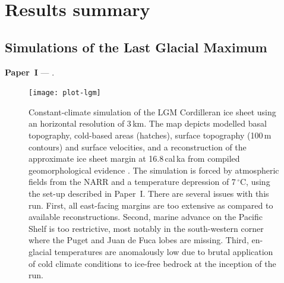 \documentclass[a4paper]{kappa}
\newcommand{\unit}[1]{\ensuremath{\mathrm{#1}}}
\newcommand{\degree}[0]{\ensuremath{^{\circ}}}
\newcommand{\degC}[0]{\unit{{\degree}C}}
\newcommand{\CCLI}[0]{Paper~I}      %
\begin{document}
\newpage
\section{Results summary}

\subsection{Simulations of the Last Glacial Maximum}

\noindent\textbf{\CCLI} --- .
\bigskip

\begin{figure}
  \begin{minipage}[t]{112.5mm}\vspace{0pt}
    \texttt{[image: plot-lgm]}
  \end{minipage}%
  \hspace{1cm}%
  \begin{minipage}[t]{47.5mm}\vspace{-12pt}  %
    \caption{Constant-climate simulation of the LGM Cordilleran ice sheet using
             an horizontal resolution of 3\,km. The map depicts modelled basal
             topography, cold-based areas (hatches), surface topography (100\,m
             contours) and surface velocities, and a reconstruction of the
             approximate ice sheet margin at 16.8\,cal\,ka from compiled
             geomorphological evidence \citep[red contour;][]{Dyke.2004}.
             The simulation is forced by atmospheric
             fields from the NARR \citep{Mesinger.etal.2006} and a temperature
             depression of 7\,\degC, using the set-up described in \CCLI. There
             are several issues with this run. First, all east-facing margins
             are too extensive as compared to available reconstructions.
             Second, marine advance on the Pacific Shelf is too restrictive,
             most notably in the south-western corner where the Puget and Juan
             de Fuca lobes are missing. Third, en-glacial temperatures are
             anomalously low due to brutal application of cold climate
             conditions to ice-free bedrock at the inception of the run.}
    \label{fig:plot-lgm}
  \end{minipage}
\end{figure}
\end{document}
